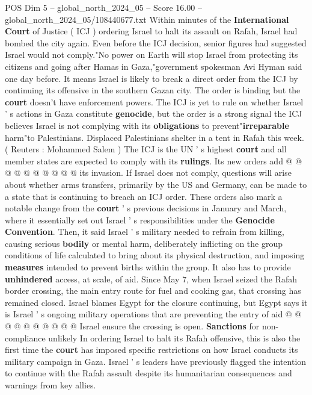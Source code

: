 \begin{textsample}{POS Dim 5 – global\_north\_2024\_05 – Score 16.00 – global\_north\_2024\_05/108440677.txt}  \label{ex:f5_pos_178}
Within minutes of the \textbf{International} \textbf{Court} of Justice ( ICJ ) ordering Israel to halt its assault on Rafah, Israel had bombed the city again.
Even before the ICJ decision, senior figures had suggested Israel would not comply."No power on Earth will stop Israel from protecting its citizens and going after Hamas in Gaza,"government spokesman Avi Hyman said one day before.
It means Israel is likely to break a direct order from the ICJ by continuing its offensive in the southern Gazan city.
The order is binding but the \textbf{court} doesn't have enforcement powers.
The ICJ is yet to rule on whether Israel ' s actions in Gaza constitute \textbf{genocide}, but the order is a strong signal the ICJ believes Israel is not complying with its \textbf{obligations} to prevent"\textbf{irreparable} harm"to Palestinians.
Displaced Palestinians shelter in a tent in Rafah this week. ( Reuters : Mohammed Salem ) The ICJ is the UN ' s highest \textbf{court} and all member states are expected to comply with its \textbf{rulings}.
Its new orders add @ @ @ @ @ @ @ @ @ @ its invasion.
If Israel does not comply, questions will arise about whether arms transfers, primarily by the US and Germany, can be made to a state that is continuing to breach an ICJ order.
These orders also mark a notable change from the \textbf{court} ' s previous decisions in January and March, where it essentially set out Israel ' s responsibilities under the \textbf{Genocide} \textbf{Convention}.
Then, it said Israel ' s military needed to refrain from killing, causing serious \textbf{bodily} or mental harm, deliberately inflicting on the group conditions of life calculated to bring about its physical destruction, and imposing \textbf{measures} intended to prevent births within the group.
It also has to provide \textbf{unhindered} access, at scale, of aid.
Since May 7, when Israel seized the Rafah border crossing, the main entry route for fuel and cooking gas, that crossing has remained closed.
Israel blames Egypt for the closure continuing, but Egypt says it is Israel ' s ongoing military operations that are preventing the entry of aid @ @ @ @ @ @ @ @ @ @ Israel ensure the crossing is open. \textbf{Sanctions} for non-compliance unlikely In ordering Israel to halt its Rafah offensive, this is also the first time the \textbf{court} has imposed specific restrictions on how Israel conducts its military campaign in Gaza.
Israel ' s leaders have previously flagged the intention to continue with the Rafah assault despite its humanitarian consequences and warnings from key allies.

\end{textsample}
